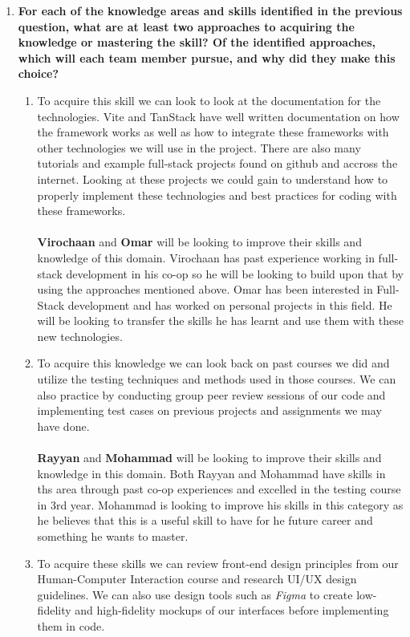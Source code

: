 \begin{enumerate}
\begin{enumerate}
  \end{enumerate}
  \item \textbf{For each of the knowledge areas and skills identified in the previous question, what are at least two approaches to acquiring the knowledge or mastering the skill?  Of the identified approaches, which will each team member pursue, and why did they make this choice?} \\
  \begin{enumerate}
    \item To acquire this skill we can look to look at the documentation for the technologies. Vite and TanStack have well written documentation on how the framework works as well as how to integrate these frameworks with other technologies we will use in the project. There are also many tutorials and example full-stack projects found on github and accross the internet. Looking at these projects we could gain to understand how to properly implement these technologies and best practices for coding with these frameworks. \\
    \\
    \textbf{Virochaan} and \textbf{Omar} will be looking to improve their skills and knowledge of this domain. Virochaan has past experience working in full-stack development in his co-op so he will be looking to build upon that by using the approaches mentioned above. Omar has been interested in Full-Stack development and has worked on personal projects in this field. He will be looking to transfer the skills he has learnt and use them with these new technologies.\\
    \item To acquire this knowledge we can look back on past courses we did and utilize the testing techniques and methods used in those courses. We can also practice by conducting group peer review sessions of our code and implementing test cases on previous projects and assignments we may have done. \\
    \\
    \textbf{Rayyan} and \textbf{Mohammad} will be looking to improve their skills and knowledge in this domain. Both Rayyan and Mohammad have skills in ths area through past co-op experiences and excelled in the testing course in 3rd year. Mohammad is looking to improve his skills in this category as he believes that this is a useful skill to have for he future career and something he wants to master.
    \item To acquire these skills we can review front-end design principles from our Human-Computer Interaction course and research UI/UX design guidelines. We can also use design tools such as \textit{Figma} to create low-fidelity and high-fidelity mockups of our interfaces before implementing them in code. \\

\end{enumerate}
\end{enumerate}
